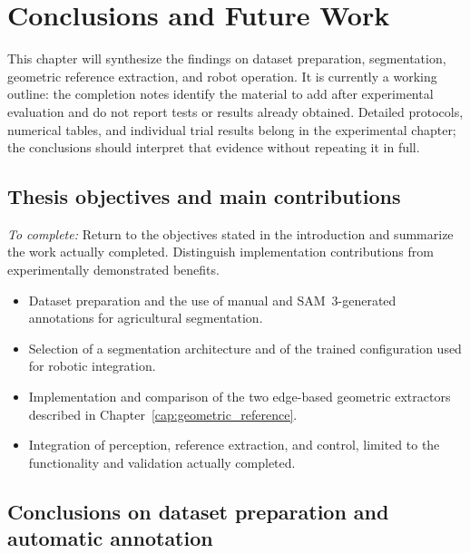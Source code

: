 \chapter{Conclusions and Future Work}
\label{cap:conclusions}

This chapter will synthesize the findings on dataset preparation,
segmentation, geometric reference extraction, and robot operation.
It is currently a working outline: the completion notes identify the
material to add after experimental evaluation and do not report tests
or results already obtained. Detailed protocols, numerical tables, and
individual trial results belong in the experimental chapter; the
conclusions should interpret that evidence without repeating it in full.

\section{Thesis objectives and main contributions}
\label{sec:c6_objectives}

\emph{To complete:} Return to the objectives stated in the introduction
and summarize the work actually completed. Distinguish implementation
contributions from experimentally demonstrated benefits.
\begin{itemize}
    \item Dataset preparation and the use of manual and SAM~3-generated
    annotations for agricultural segmentation.
    \item Selection of a segmentation architecture and of the trained
    configuration used for robotic integration.
    \item Implementation and comparison of the two edge-based geometric
    extractors described in Chapter~\ref{cap:geometric_reference}.
    \item Integration of perception, reference extraction, and control,
    limited to the functionality and validation actually completed.
\end{itemize}

\section{Conclusions on dataset preparation and automatic annotation}
\label{sec:c6_annotation}

